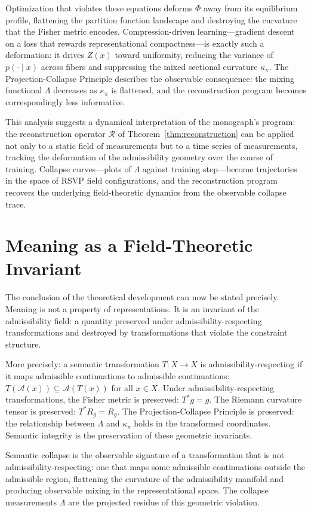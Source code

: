 \documentclass[12pt, oneside]{book}
\theoremstyle{plain-flyxion}
\theoremstyle{definition-flyxion}
\newcommand{\A}{\mathcal{A}}
\newcommand{\kpi}{\kappa_{\pi}}
\newcommand{\Lam}{\Lambda}
\begin{document}
Optimization that violates these equations deforms $\Phi$ away from its equilibrium
profile, flattening the partition function landscape and destroying the curvature that the
Fisher metric encodes. Compression-driven learning---gradient descent on a loss that
rewards representational compactness---is exactly such a deformation: it drives $Z(x)$
toward uniformity, reducing the variance of $p(\cdot\mid x)$ across fibers and
suppressing the mixed sectional curvature $\kpi$. The Projection-Collapse Principle
describes the observable consequence: the mixing functional $\Lam$ decreases as $\kpi$
is flattened, and the reconstruction program becomes correspondingly less informative.

This analysis suggests a dynamical interpretation of the monograph's program: the
reconstruction operator $\mathcal{R}$ of Theorem~\ref{thm:reconstruction} can be applied
not only to a static field of measurements but to a time series of measurements, tracking
the deformation of the admissibility geometry over the course of training. Collapse
curves---plots of $\Lam$ against training step---become trajectories in the space of
RSVP field configurations, and the reconstruction program recovers the underlying
field-theoretic dynamics from the observable collapse trace.



\section{Meaning as a Field-Theoretic Invariant}

The conclusion of the theoretical development can now be stated precisely. Meaning is not
a property of representations. It is an invariant of the admissibility field: a quantity
preserved under admissibility-respecting transformations and destroyed by transformations
that violate the constraint structure.

More precisely: a semantic transformation $T: X\to X$ is admissibility-respecting if it
maps admissible continuations to admissible continuations: $T(\A(x))\subseteq \A(T(x))$
for all $x\in X$. Under admissibility-respecting transformations, the Fisher metric is
preserved: $T^*g = g$. The Riemann curvature tensor is preserved: $T^*R_g = R_g$. The
Projection-Collapse Principle is preserved: the relationship between $\Lam$ and $\kpi$
holds in the transformed coordinates. Semantic integrity is the preservation of these
geometric invariants.

Semantic collapse is the observable signature of a transformation that is not
admissibility-respecting: one that maps some admissible continuations outside the
admissible region, flattening the curvature of the admissibility manifold and producing
observable mixing in the representational space. The collapse measurements $\Lam$ are the
projected residue of this geometric violation.
\end{document}
